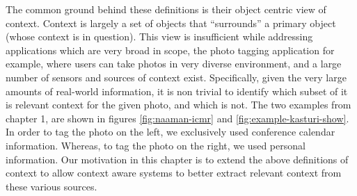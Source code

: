 The common ground behind these definitions is their object centric view of context. Context is largely a set of objects that ``surrounds'' a primary object (whose context is in question). This view is insufficient while addressing applications which are very broad in scope, the photo tagging application for example, where users can take photos in very diverse environment, and a large number of sensors and sources of context exist. Specifically, given the very large amounts of real-world information, it is non trivial to identify which subset of it is relevant context for the given photo, and which is not. The two examples from chapter 1, are shown in figures \ref{fig:naaman-icmr} and \ref{fig:example-kasturi-show}. In order to tag the photo on the left, we exclusively used conference calendar information. Whereas, to tag the photo on the right, we used personal information. Our motivation in this chapter is to extend the above definitions of context to allow context aware systems to better extract relevant context from these various sources.

